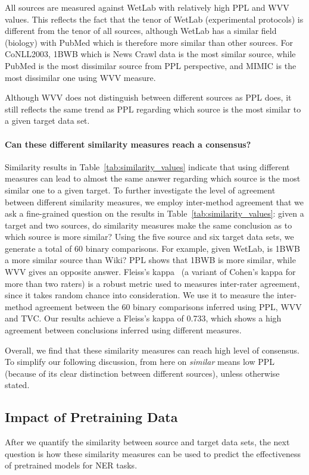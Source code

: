 \documentclass[11pt,a4paper]{article}
\begin{document}
All sources are measured against WetLab with relatively high PPL and WVV values. 
This reflects the fact that the tenor of WetLab (experimental protocols) is different from the tenor of all sources, although WetLab has a similar field (biology) with PubMed which is therefore more similar than other sources. 
For CoNLL2003, 1BWB which is News Crawl data is the most similar source, while PubMed is the most dissimilar source from PPL perspective, and MIMIC is the most dissimilar one using WVV measure. 

Although WVV does not distinguish between different sources as PPL does, it still reflects the same trend as PPL regarding which source is the most similar to a given target data set.

\paragraph{Can these different similarity measures reach a consensus?}
Similarity results in Table~\ref{tab:similarity_values} indicate that using different measures can lead to almost the same answer regarding which source is the most similar one to a given target. 
To further investigate the level of agreement between different similarity measures, we employ inter-method agreement that we ask a fine-grained question on the results in Table~\ref{tab:similarity_values}: given a target and two sources, do similarity measures make the same conclusion as to which source is more similar? 
Using the five source and six target data sets, we generate a total of 60 binary comparisons.
For example, given WetLab, is 1BWB a more similar source than Wiki? 
PPL shows that 1BWB is more similar, while WVV gives an opposite answer. 
Fleiss's kappa~\cite{Fleiss:1971} (a variant of Cohen's kappa for more than two raters) is a robust metric used to measures inter-rater agreement, since it takes random chance into consideration. 
We use it to measure the inter-method agreement between the 60 binary comparisons inferred using PPL, WVV and TVC. 
Our results achieve a Fleiss's kappa of 0.733, which shows a high agreement between conclusions inferred using different measures.

Overall, we find that these similarity measures can reach high level of consensus. 
To simplify our following discussion, from here on {\em similar} means low PPL (because of its clear distinction between different sources), unless otherwise stated.


\subsection{Impact of Pretraining Data}\label{sec-impactpretrainingdata}
After we quantify the similarity between source and target data sets, the next question is how these similarity measures can be used to predict the effectiveness of pretrained models for NER tasks. 
\end{document}
